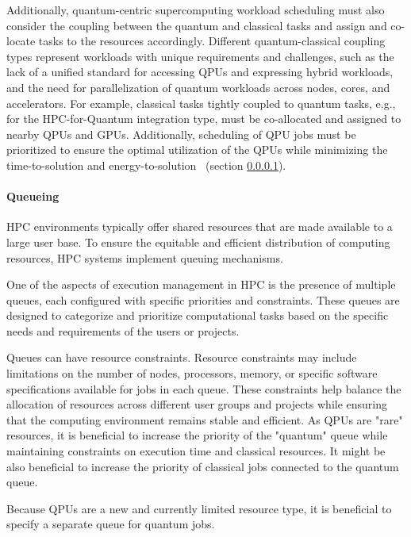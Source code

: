 Additionally, quantum-centric supercomputing workload scheduling must also consider the coupling between the quantum and classical tasks and assign and co-locate tasks to the resources accordingly. Different quantum-classical coupling types represent workloads with unique requirements and challenges, such as the lack of a unified standard for accessing QPUs and expressing hybrid workloads, and the need for parallelization of quantum workloads across nodes, cores, and accelerators. For example, classical tasks tightly coupled to quantum tasks, e.g., for the HPC-for-Quantum integration type, must be co-allocated and assigned to nearby QPUs and GPUs. Additionally, scheduling of  QPU jobs must be prioritized to ensure the optimal utilization of the QPUs while minimizing the time-to-solution and energy-to-solution~\cite{saurabh2023conceptual} (section \ref{queueing}).


\paragraph{\textbf{Queueing}}
\label{queueing}

HPC environments typically offer shared resources that are made available to a large user base. To ensure the equitable and efficient distribution of computing resources, HPC systems implement queuing mechanisms. 

One of the aspects of execution management in HPC is the presence of multiple queues, each configured with specific priorities and constraints. These queues are designed to categorize and prioritize computational tasks based on the specific needs and requirements of the users or projects.

Queues can have resource constraints. Resource constraints may include limitations on the number of nodes, processors, memory, or specific software specifications available for jobs in each queue. These constraints help balance the allocation of resources across different user groups and projects while ensuring that the computing environment remains stable and efficient.  As QPUs are "rare" resources, it is beneficial to increase the priority of the "quantum" queue while maintaining constraints on execution time and classical resources. It might be also beneficial to increase the priority of classical jobs connected to the quantum queue.

Because QPUs are a new and currently limited resource type, it is beneficial to specify a separate queue for quantum jobs.

